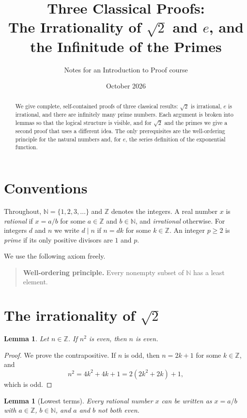\documentclass[11pt]{article}
\title{Three Classical Proofs:\\The Irrationality of $\sqrt{2}$ and $e$, and the Infinitude of the Primes}
\author{Notes for an Introduction to Proof course}
\date{October 2026}
\theoremstyle{plain}
\newtheorem{lemma}[theorem]{Lemma}
\theoremstyle{definition}
\theoremstyle{remark}
\newcommand{\Z}{\mathbb{Z}}
\newcommand{\N}{\mathbb{N}}
\begin{document}
\maketitle

\begin{abstract}
We give complete, self-contained proofs of three classical results: $\sqrt{2}$ is irrational, $e$ is irrational, and there are infinitely many prime numbers. Each argument is broken into lemmas so that the logical structure is visible, and for $\sqrt{2}$ and the primes we give a second proof that uses a different idea. The only prerequisites are the well-ordering principle for the natural numbers and, for $e$, the series definition of the exponential function.
\end{abstract}

\section{Conventions}
\label{sec:conventions}

Throughout, $\N = \{1, 2, 3, \dots\}$ and $\Z$ denotes the integers. A real number $x$ is \emph{rational} if $x = a/b$ for some $a \in \Z$ and $b \in \N$, and \emph{irrational} otherwise. For integers $d$ and $n$ we write $d \mid n$ if $n = dk$ for some $k \in \Z$. An integer $p \ge 2$ is \emph{prime} if its only positive divisors are $1$ and $p$.

We use the following axiom freely.

\begin{quote}
\textbf{Well-ordering principle.} Every nonempty subset of $\N$ has a least element.
\end{quote}

\section{The irrationality of \texorpdfstring{$\sqrt{2}$}{sqrt 2}}
\label{sec:sqrt2}

\begin{lemma}
\label{lem:parity}
Let $n \in \Z$. If $n^2$ is even, then $n$ is even.
\end{lemma}

\begin{proof}
We prove the contrapositive. If $n$ is odd, then $n = 2k + 1$ for some $k \in \Z$, and
\[
  n^2 = 4k^2 + 4k + 1 = 2(2k^2 + 2k) + 1,
\]
which is odd.
\end{proof}

\begin{lemma}[Lowest terms]
\label{lem:lowest-terms}
Every rational number $x$ can be written as $x = a/b$ with $a \in \Z$, $b \in \N$, and $a$ and $b$ not both even.
\end{lemma}
\end{document}
